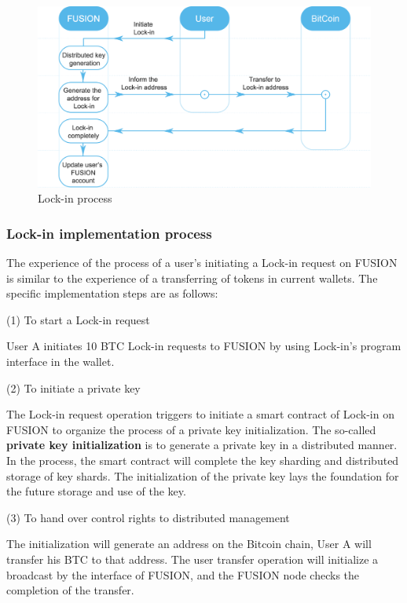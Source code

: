\documentclass[a4paper,12pt]{article}
\begin{document}
\begin{figure} [htbp]
\centering \includegraphics [width = 5in]{pic/lockin.png}
\caption{Lock-in process} \label{fig: 1}
\end{figure}

\subsubsection{Lock-in implementation process}

The experience of the process of a user's initiating a Lock-in request on FUSION is similar to the experience of a transferring of tokens in current wallets. The specific implementation steps are as follows:

(1) To start a Lock-in request

User A initiates 10 BTC Lock-in requests to FUSION by using Lock-in's program interface in the wallet.

(2) To initiate a private key

The Lock-in request operation triggers to initiate a smart contract of Lock-in on FUSION to organize the process of a private key initialization. The so-called {\bfseries{private key initialization}} is to generate a private key in a distributed manner. In the process, the smart contract will complete the key sharding and distributed storage of key shards. The initialization of the private key lays the foundation for the future storage and use of the key.

(3) To hand over control rights to distributed management

The initialization will generate an address on the Bitcoin chain, User A will transfer his BTC to that address. The user transfer operation will initialize a broadcast by the interface of FUSION, and the FUSION node checks the completion of the transfer.
\end{document}
